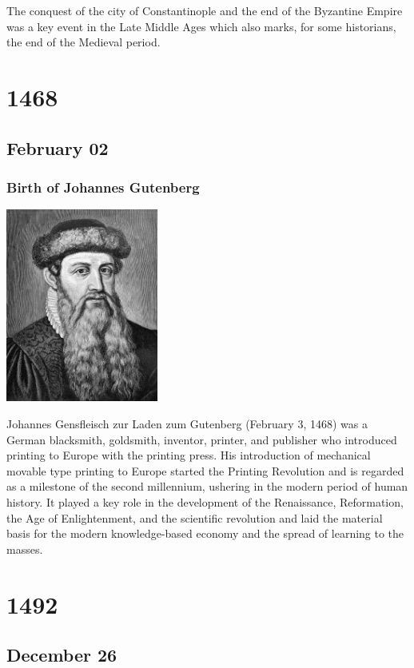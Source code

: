 \documentclass[11pt]{report}
\begin{document}
The conquest of the city of Constantinople and the end of the Byzantine Empire was a key event in the Late Middle Ages which also marks, for some historians, the end of the Medieval period.

\chapter{1468}
\section{February 02}
\subsection{Birth of Johannes Gutenberg}
\vspace{2mm}\begin{center}\includegraphics[width=5cm]{./img/gutenberg.jpg}\end{center}
Johannes Gensfleisch zur Laden zum Gutenberg (February 3, 1468) was a German blacksmith, goldsmith, inventor, printer, and publisher who introduced printing to Europe with the printing press. His introduction of mechanical movable type printing to Europe started the Printing Revolution and is regarded as a milestone of the second millennium, ushering in the modern period of human history. It played a key role in the development of the Renaissance, Reformation, the Age of Enlightenment, and the scientific revolution and laid the material basis for the modern knowledge-based economy and the spread of learning to the masses.

\chapter{1492}
\section{December 26}
\end{document}
